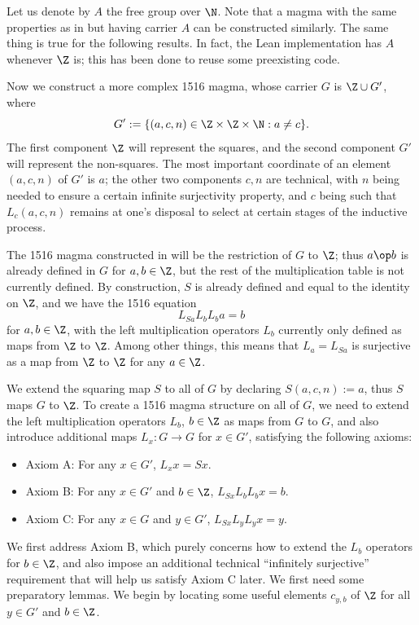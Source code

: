 Let us denote by $A$ the free group over $\N$. Note that a magma with the same properties as in  but having carrier $A$ can be constructed similarly.
The same thing is true for the following results. In fact, the Lean implementation has $A$ whenever $\Z$ is; this has been done to reuse some preexisting code.

Now we construct a more complex 1516 magma, whose carrier $G$ is $\Z \cup G'$, where
$$G' := \{ (a,c,n) \in \Z \times \Z \times \N : a \neq c\}.$$
The first component $\Z$ will represent the squares, and the second component $G'$ will represent the non-squares.  The most important coordinate of an element $(a,c,n)$ of $G'$ is $a$; the other two components $c,n$ are technical, with $n$ being needed to ensure a certain infinite surjectivity property, and $c$ being such that $L_c (a,c,n)$ remains at one's disposal to select at certain stages of the inductive process.

The 1516 magma constructed in  will be the restriction of $G$ to $\Z$; thus $a \op b$ is already defined in $G$ for $a,b \in \Z$, but the rest of the multiplication table is not currently defined.  By construction, $S$ is already defined and equal to the identity on $\Z$, and we have the 1516 equation
$$ L_{Sa} L_b L_b a = b$$
for $a,b \in \Z$, with the left multiplication operators $L_b$ currently only defined as maps from $\Z$ to $\Z$.  Among other things, this means that $L_a = L_{Sa}$ is surjective as a map from $\Z$ to $\Z$ for any $a \in \Z$.

We extend the squaring map $S$ to all of $G$ by declaring $S(a,c,n) := a$, thus $S$ maps $G$ to $\Z$.  To create a 1516 magma structure on all of $G$, we need to extend the left multiplication operators $L_b$, $b \in \Z$ as maps from $G$ to $G$, and also introduce additional maps $L_x: G \to G$ for $x \in G'$, satisfying the following axioms:

\begin{itemize}
\item Axiom A: For any $x \in G'$, $L_x x = Sx$.
\item Axiom B: For any $x \in G'$ and $b \in \Z$, $L_{Sx} L_b L_b x = b$.
\item Axiom C: For any $x \in G$ and $y \in G'$, $L_{Sx} L_y L_y x = y$.
\end{itemize}

We first address Axiom B, which purely concerns how to extend the $L_b$ operators for $b \in \Z$, and also impose an additional technical ``infinitely surjective'' requirement that will help us satisfy Axiom C later.  We first need some preparatory lemmas.  We begin by locating some useful elements $c_{y,b}$ of $\Z$ for all $y \in G'$ and $b \in \Z$.

